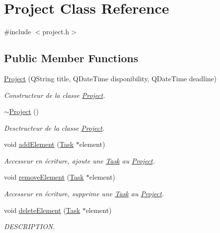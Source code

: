 \hypertarget{class_project}{}\section{Project Class Reference}
\label{class_project}


{\ttfamily \#include $<$project.\+h$>$}

\subsection*{Public Member Functions}
\begin{DoxyCompactItemize}
\item 
\hyperlink{class_project_a6313d992d20a4e752aa48b1bf74f1d0b}{Project} (Q\+String title, Q\+Date\+Time disponibility, Q\+Date\+Time deadline)
\begin{DoxyCompactList}\small\item\em Constructeur de la classe \hyperlink{class_project}{Project}. \end{DoxyCompactList}\item 
\hyperlink{class_project_ad165d61b76ee86ee9c27fd987a2a7b9e}{$\sim$\+Project} ()
\begin{DoxyCompactList}\small\item\em Desctructeur de la classe \hyperlink{class_project}{Project}. \end{DoxyCompactList}\item 
void \hyperlink{class_project_a2f8b6bc23d76567eaf47d34669e753f1}{add\+Element} (\hyperlink{class_task}{Task} $\ast$element)
\begin{DoxyCompactList}\small\item\em Accesseur en écriture, ajoute une \hyperlink{class_task}{Task} au \hyperlink{class_project}{Project}. \end{DoxyCompactList}\item 
void \hyperlink{class_project_a63aa6261d77fa27f70296aa96d1a25bf}{remove\+Element} (\hyperlink{class_task}{Task} $\ast$element)
\begin{DoxyCompactList}\small\item\em Accesseur en écriture, supprime une \hyperlink{class_task}{Task} au \hyperlink{class_project}{Project}. \end{DoxyCompactList}\item 
void \hyperlink{class_project_a4d92947dd9f030f188c7f97fd9674423}{delete\+Element} (\hyperlink{class_task}{Task} $\ast$element)
\begin{DoxyCompactList}\small\item\em D\+E\+S\+C\+R\+I\+P\+T\+I\+O\+N. \end{DoxyCompactList}\item 

\end{DoxyCompactItemize}
